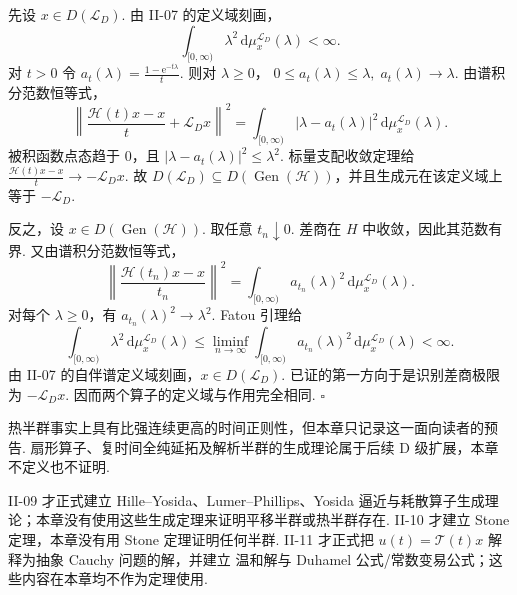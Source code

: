 \begin{FAProof}
先设 \(\displaystyle x\in D(\mathcal L_D)\). 由 II-07 的定义域刻画，
\[
\int_{[0,\infty)}\lambda^2\,\mathrm{d}\mu_x^{\mathcal L_D}(\lambda)<\infty.
\]
对 \(\displaystyle t>0\) 令
\(\displaystyle a_t(\lambda)=\frac{1-\mathrm{e}^{-t\lambda}}t.\)
则对 \(\displaystyle\lambda\geqslant0\)，
\(\displaystyle 0\leqslant a_t(\lambda)\leqslant\lambda,\; a_t(\lambda)\longrightarrow\lambda.\)
由谱积分范数恒等式，
\[
\left\|
\frac{\mathcal H(t)x-x}{t}+\mathcal L_Dx
\right\|^2
=
\int_{[0,\infty)}
|\lambda-a_t(\lambda)|^2
\,\mathrm{d}\mu_x^{\mathcal L_D}(\lambda).
\]
被积函数点态趋于 \(\displaystyle0\)，且 \(\displaystyle|\lambda-a_t(\lambda)|^2\leqslant\lambda^2\). 标量支配收敛定理给
\(\displaystyle \frac{\mathcal H(t)x-x}{t} \longrightarrow -\mathcal L_Dx.\)
故 \(\displaystyle D(\mathcal L_D)\subseteq D(\operatorname{Gen}(\mathcal H))\)，并且生成元在该定义域上等于 \(\displaystyle-\mathcal L_D\).

反之，设 \(\displaystyle x\in D(\operatorname{Gen}(\mathcal H))\). 取任意 \(\displaystyle t_n\downarrow0\). 差商在 \(\displaystyle H\) 中收敛，因此其范数有界. 又由谱积分范数恒等式，
\[
\left\|
\frac{\mathcal H(t_n)x-x}{t_n}
\right\|^2
=
\int_{[0,\infty)}a_{t_n}(\lambda)^2
\,\mathrm{d}\mu_x^{\mathcal L_D}(\lambda).
\]
对每个 \(\displaystyle\lambda\geqslant0\)，有 \(\displaystyle a_{t_n}(\lambda)^2\to\lambda^2\). Fatou 引理给
\[
\int_{[0,\infty)}\lambda^2\,\mathrm{d}\mu_x^{\mathcal L_D}(\lambda)
\leqslant
\liminf_{n\to\infty}
\int_{[0,\infty)}a_{t_n}(\lambda)^2
\,\mathrm{d}\mu_x^{\mathcal L_D}(\lambda)
<\infty.
\]
由 II-07 的自伴谱定义域刻画，\(\displaystyle x\in D(\mathcal L_D)\). 已证的第一方向于是识别差商极限为 \(\displaystyle-\mathcal L_Dx\). 因而两个算子的定义域与作用完全相同.
\hfill\(\square\)
\end{FAProof}

\begin{FARemark}[解析半群边界]
热半群事实上具有比强连续更高的时间正则性，但本章只记录这一面向读者的预告. 扇形算子、复时间全纯延拓及解析半群的生成理论属于后续 D 级扩展，本章不定义也不证明.
\end{FARemark}

\begin{FAWarning}[II-09、II-10 与 II-11 边界]
II-09 才正式建立 Hille--Yosida、Lumer--Phillips、Yosida 逼近与耗散算子生成理论；本章没有使用这些生成定理来证明平移半群或热半群存在. II-10 才建立 Stone 定理，本章没有用 Stone 定理证明任何半群. II-11 才正式把 \(\displaystyle u(t)=\mathcal T(t)x\) 解释为抽象 Cauchy 问题的解，并建立 温和解与 Duhamel 公式/常数变易公式；这些内容在本章均不作为定理使用.
\end{FAWarning}

